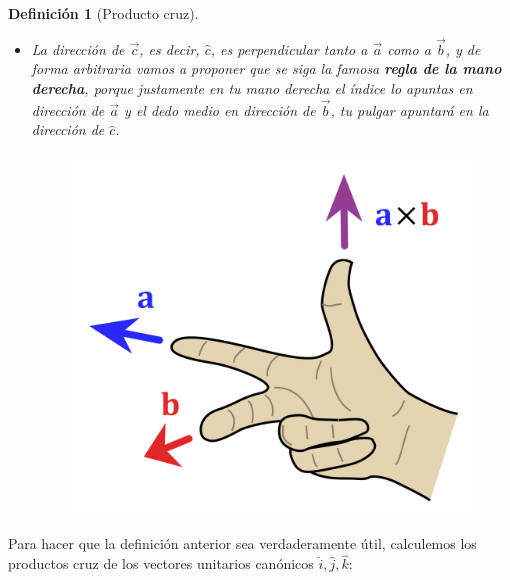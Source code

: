 \documentclass[12pt, fleqn]{report}                             %
\newtheorem{Definition}{Definición}[section]                    %
\theoremstyle{break}                                            %
\begin{document}
\begin{Definition}[Producto cruz]
\begin{itemize}
                    \item La dirección de $\vec{c}$, es decir, $\hat{c}$, es perpendicular tanto a $\vec{a}$ como a $\vec{b}$, y de forma arbitraria vamos a proponer que se siga la famosa \textbf{regla de la mano derecha}, porque justamente en tu mano derecha el índice lo apuntas en dirección de $\vec{a}$ y el dedo medio en dirección de $\vec{b}$, tu pulgar apuntará en la dirección de $\hat{c}$.
                    \begin{figure}[H]
                        \centering
                        \includegraphics[scale=0.2]{rightHandRule.png}
                    \end{figure}
                \end{itemize}
            \end{Definition}
        
            Para hacer que la definición anterior sea verdaderamente útil, calculemos los productos cruz de los vectores unitarios canónicos $\hat{i}, \hat{j}, \hat{k}$:
            
\end{document}

